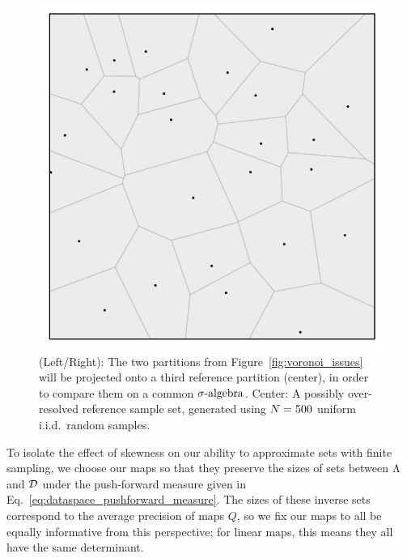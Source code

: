 \begin{figure}[ht]
\begin{minipage}{.4\textwidth}
	\end{minipage}
		\begin{minipage}{.275\textwidth}
		\includegraphics[width=\linewidth]{./images/voronoi_diagrams/voronoi_diagram_N25_r10_no_label}
	\end{minipage}
\caption{
(Left/Right): The two partitions from Figure~\ref{fig:voronoi_issues} will be projected onto a third reference partition (center), in order to compare them on a common $\sigma\text{-algebra}$.
Center: A possibly over-resolved reference sample set, generated using $N = 500$ uniform i.i.d.~random samples.
}
\label{fig:voronoi_sols}
\end{figure}

To isolate the effect of skewness on our ability to approximate sets with finite sampling, we choose our maps so that they preserve the sizes of sets between ${\Lambda}$ and $\mathcal{D}$ under the push-forward measure given in Eq.~\eqref{eq:dataspace_pushforward_measure}.
The sizes of these inverse sets correspond to the average precision of maps $Q$, so we fix our maps to all be equally informative from this perspective; for linear maps, this means they all have the same determinant.

